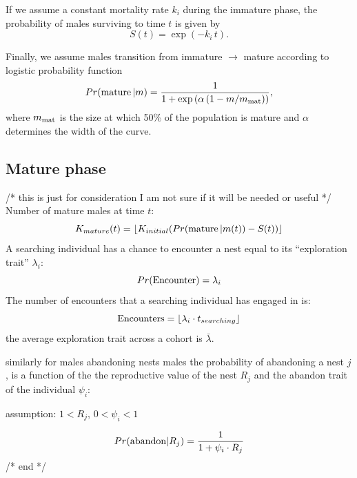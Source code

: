 \documentclass[a4paper,11pt]{article}
\begin{document}
If we assume a constant mortality rate $k_i$ during the immature phase, the probability of males surviving to time $t$ is given by
\begin{equation} \label{eq:surv_immature}
S(t) = \exp(-k_i \, t).
\end{equation}

Finally, we assume males transition from immature $\rightarrow$ mature according to logistic probability function
\begin{equation}\label{eq:allocation}
Pr({\rm mature} \, | m) = \frac1{1 + \exp\left(\alpha \left(1 - m / m_{\rm mat}\right)\right)},
\end{equation}
where $m_{\rm mat}$ is the size at which 50\% of the population is mature and $\alpha$ determines the width of the curve.

\subsection{Mature phase}

/* this is just for consideration I am not sure if it will be needed or useful */
Number of mature males at time $t$:
\begin{equation} \label{eq:num_mature}
    K_{mature}(t) = \lfloor{K_{initial}(Pr({\rm mature} \, | m(t)) - S(t))}\rfloor
\end{equation}
A searching individual has a chance to encounter a nest equal to its ``exploration trait'' $\lambda_i$:
\begin{equation} \label{eq:encounter probability}
    Pr({\rm Encounter}) = \lambda_i
\end{equation}
The number of encounters that a searching individual has engaged in is:
\begin{equation} \label{eq:encounter rate}
    {\rm Encounters} = \lfloor\lambda_i \cdot t_{searching}\rfloor
\end{equation}
the average exploration trait across a cohort is $\bar\lambda$.

similarly for males abandoning nests males the probability of abandoning a nest $j$, is a function of the  the reproductive value of the nest $R_j$ and the abandon trait of the individual $\psi_i$: 

assumption: $1 < R_j$, $0 < \psi_i < 1$

\begin{equation} \label{eq:abandon}
    Pr({\rm abandon} | R_j ) = \frac{1}{1 + \psi_i \cdot R_j}
\end{equation}
/* end */
\end{document}
